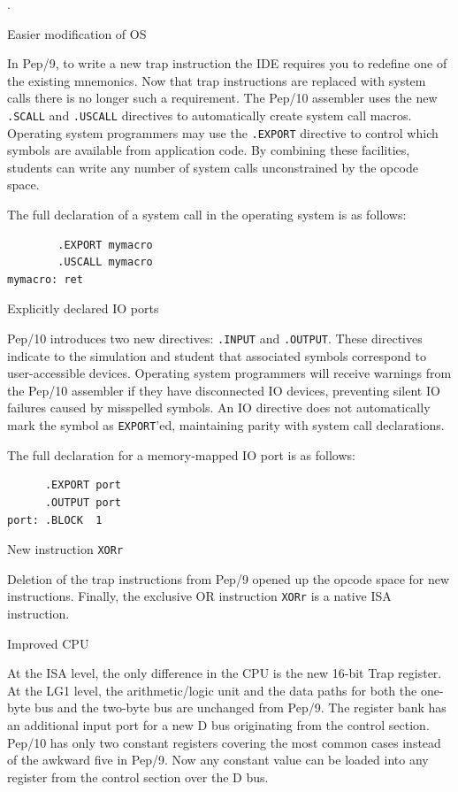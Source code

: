 \documentclass[10pt,fleqn]{book}
\newenvironment{exercises}
   {\begin{list}
      {\arabic{ecounter}.}
      {
         \usecounter{ecounter}
         \setcounter {ecounter}{0}
         \setlength\leftmargin{2pc}
         \setlength\labelwidth{6pc}
         \setlength\labelsep{1pc}
      }}
   {\end{list}}
\newcounter{ecounter}
\begin{document}
\begin{exercises}
\item Easier modification of OS

In Pep/9, to write a new trap instruction the IDE requires you to redefine one of the existing mnemonics.
Now that trap instructions are replaced with system calls there is no longer such a requirement.
The Pep/10 assembler uses the new \verb|.SCALL| and \verb|.USCALL| directives to automatically create system call macros.
Operating system programmers may use the \verb|.EXPORT| directive to control which symbols are available from application code.
By combining these facilities, students can write any number of system calls unconstrained by the opcode space.

The full declaration of a system call in the operating system is as follows:
\begin{verbatim}
        .EXPORT mymacro
        .USCALL mymacro
mymacro: ret
\end{verbatim}

\item Explicitly declared IO ports

Pep/10 introduces two new directives: \verb|.INPUT| and \verb|.OUTPUT|.
These directives indicate to the simulation and student that associated symbols correspond to user-accessible devices.
Operating system programmers will receive warnings from the Pep/10 assembler if they have disconnected IO devices, preventing silent IO failures caused by misspelled symbols.
An IO directive does not automatically mark the symbol as \verb|EXPORT|'ed, maintaining parity with system call declarations.

The full declaration for a memory-mapped IO port is as follows:
\begin{verbatim}
      .EXPORT port
      .OUTPUT port
port: .BLOCK  1
\end{verbatim}

\item New instruction \verb|XORr|

Deletion of the trap instructions from Pep/9 opened up the opcode space for new instructions.
Finally, the exclusive OR instruction \verb|XORr| is a native ISA instruction.

\item Improved CPU

At the ISA level, the only difference in the CPU is the new 16-bit Trap register.
At the LG1 level, the arithmetic/logic unit and the data paths for both the one-byte bus and the two-byte bus are unchanged from Pep/9.
The register bank has an additional input port for a new D bus originating from the control section.
Pep/10 has only two constant registers covering the most common cases instead of the awkward five in Pep/9.
Now any constant value can be loaded into any register from the control section over the D bus.


\end{exercises}
\end{document}
